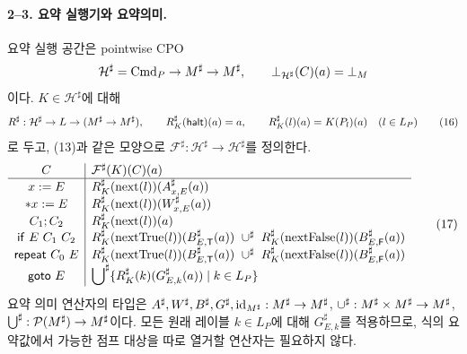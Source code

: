 \documentclass[a4paper,10pt]{article}
\begin{document}

\paragraph{2--3. 요약 실행기와 요약의미.}
요약 실행 공간은 pointwise CPO
\[
 \mathcal H^\sharp=\mathrm{Cmd}_P\to M^\sharp\to M^\sharp,\qquad
 \bot_{\mathcal H^\sharp}(C)(a)=\bot_M
\]
이다. $K\in\mathcal H^\sharp$에 대해
\[
 R^\sharp:\mathcal H^\sharp\to L\to(M^\sharp\to M^\sharp),\qquad
 R^\sharp_K(\mathsf{halt})(a)=a,\qquad
 R^\sharp_K(l)(a)=K(P_l)(a)\quad(l\in L_P)                       \tag{16}
\]
로 두고, (13)과 같은 모양으로
$\mathcal F^\sharp:\mathcal H^\sharp\to\mathcal H^\sharp$를 정의한다.
\[
\begin{array}{c|l}
 C&\mathcal F^\sharp(K)(C)(a)\\ \hline
 x:=E&R^\sharp_K(\operatorname{next}(l))(A^\sharp_{x,E}(a))\\
 *x:=E&R^\sharp_K(\operatorname{next}(l))(W^\sharp_{x,E}(a))\\
 C_1;C_2&R^\sharp_K(\operatorname{next}(l))(a)\\
 \mathsf{if}\ E\ C_1\ C_2&
 R^\sharp_K(\operatorname{nextTrue}(l))(B^\sharp_{E,\mathsf T}(a))
 \ \cup^\sharp\ R^\sharp_K(\operatorname{nextFalse}(l))(B^\sharp_{E,\mathsf F}(a))\\
 \mathsf{repeat}\ C_0\ E&
 R^\sharp_K(\operatorname{nextTrue}(l))(B^\sharp_{E,\mathsf T}(a))
 \ \cup^\sharp\ R^\sharp_K(\operatorname{nextFalse}(l))(B^\sharp_{E,\mathsf F}(a))\\
 \mathsf{goto}\ E&
 \displaystyle\bigcup\nolimits^\sharp\{R^\sharp_K(k)(G^\sharp_{E,k}(a))\mid k\in L_P\}
\end{array}                                                       \tag{17}
\]
요약 의미 연산자의 타입은
$A^\sharp,W^\sharp,B^\sharp,G^\sharp,\operatorname{id}_{M^\sharp}:M^\sharp\to M^\sharp$,
$\cup^\sharp:M^\sharp\times M^\sharp\to M^\sharp$,
$\bigcup\nolimits^\sharp:\mathcal P(M^\sharp)\to M^\sharp$이다.
모든 원래 레이블 $k\in L_P$에 대해 $G^\sharp_{E,k}$를 적용하므로,
식의 요약값에서 가능한 점프 대상을 따로 열거할 연산자는 필요하지 않다.
\end{document}

